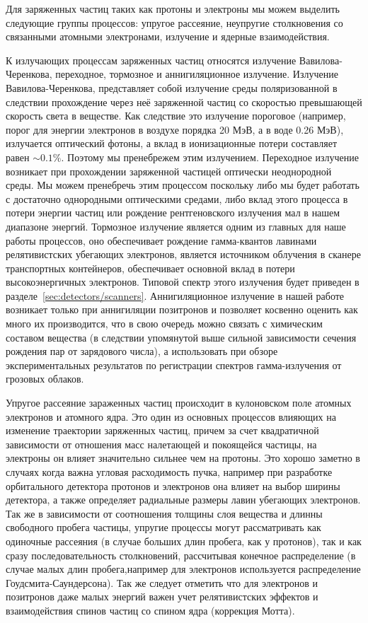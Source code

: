 Для заряженных частиц таких как протоны и электроны мы можем выделить следующие группы процессов: упругое рассеяние, неупругие столкновения со связанными атомными электронами, излучение и ядерные взаимодействия. 

К излучающих процессам заряженных частиц относятся излучение Вавилова-Черенкова, переходное, тормозное и аннигиляционное излучение. 
Излучение Вавилова-Черенкова, представляет собой излучение среды поляризованной в следствии  прохождение через неё заряженной частиц со скоростью превышающей скорость света в веществе. Как следствие это излучение пороговое (например, порог для энергии электронов в воздухе порядка 20 МэВ, а в воде 0.26 МэВ), излучается оптический фотоны, а вклад в ионизационные потери составляет равен $\sim 0.1 \%$. Поэтому мы пренебрежем этим излучением. Переходное излучение возникает при прохождении заряженной частицей оптически неоднородной среды. Мы можем пренебречь этим процессом поскольку либо  мы будет работать с достаточно однородными оптическими средами, либо вклад этого процесса в потери энергии частиц или рождение рентгеновского излучения мал в нашем диапазоне энергий. Тормозное излучение является одним из главных для наше работы процессов, оно обеспечивает рождение гамма-квантов лавинами релятивистских убегающих электронов, является источником облучения в сканере транспортных контейнеров, обеспечивает основной вклад в потери высокоэнергичных электронов. Типовой спектр этого излучения будет приведен в разделе~\ref{sec:detectors/scanners}. Аннигиляционное излучение в нашей работе возникает только при аннигиляции позитронов и позволяет косвенно оценить как много их производится, что в свою очередь можно связать с химическим составом вещества (в следствии упомянутой выше сильной зависимости сечения рождения пар от зарядового числа), а использовать при обзоре экспериментальных результатов по регистрации спектров гамма-излучения от грозовых облаков. 

Упругое рассеяние зараженных частиц происходит в кулоновском поле атомных электронов и атомного ядра. Это один из основных процессов влияющих на изменение траектории заряженных частиц, причем за счет квадратичной зависимости от отношения масс налетающей и покоящейся частицы, на электроны он влияет значительно сильнее чем на протоны.  Это хорошо заметно в случаях когда важна угловая расходимость пучка, например при разработке орбитального детектора протонов и электронов она влияет на выбор ширины детектора, а также определяет радиальные размеры лавин убегающих электронов. Так же в зависимости от соотношения толщины слоя вещества и длинны свободного пробега частицы, упругие процессы могут рассматривать как одиночные рассеяния (в случае больших длин пробега, как у протонов), так и как сразу последовательность столкновений, рассчитывая конечное распределение (в случае малых длин пробега,например для электронов используется распределение Гоудсмита-Саундерсона). Так же следует отметить что для электронов и позитронов даже малых энергий важен учет релятивистских эффектов и взаимодействия спинов частиц со спином ядра (коррекция Мотта). 

